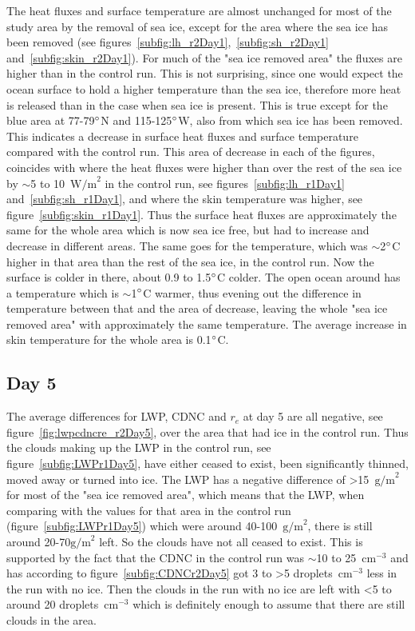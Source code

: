 The heat fluxes and surface temperature are almost unchanged for most of the study area by the removal of sea ice, except for the area where the sea ice has been removed (see figures~\ref{subfig:lh_r2Day1},~\ref{subfig:sh_r2Day1} and~\ref{subfig:skin_r2Day1}). For much of the "sea ice removed area" the fluxes are higher than in the control run. This is not surprising, since one would expect the ocean surface to hold a higher temperature than the sea ice, therefore more heat is released than in the case when sea ice is present. This is true except for the blue area at 77-79$\degree$N and 115-125$\degree$W, also from which sea ice has been removed. This indicates a decrease in surface heat fluxes and surface temperature compared with the control run. This area of decrease in each of the figures, coincides with where the heat fluxes were higher than over the rest of the sea ice by $\sim$5 to 10~$\text{W/m}^2$ in the control run, see figures~\ref{subfig:lh_r1Day1} and~\ref{subfig:sh_r1Day1}, and where the skin temperature was higher, see figure~\ref{subfig:skin_r1Day1}. Thus the surface heat fluxes are approximately the same for the whole area which is now sea ice free, but had to increase and decrease in different areas. The same goes for the temperature, which was $\sim$2$\degree$C higher in that area than the rest of the sea ice, in the control run. Now the surface is colder in there, about 0.9 to 1.5$\degree$C colder. The open ocean around has a temperature which is $\sim$1$\degree$C warmer, thus evening out the difference in temperature between that and the area of decrease, leaving the whole "sea ice removed area" with approximately the same temperature. The average increase in skin temperature for the whole area is 0.1$\degree$C.

\clearpage
\subsection{Day 5}
The average differences for LWP, CDNC and $r_e$ at day 5 are all negative, see figure~\ref{fig:lwpcdncre_r2Day5}, over the area that had ice in the control run. Thus the clouds making up the LWP in the control run, see figure~\ref{subfig:LWPr1Day5}, have either ceased to exist, been significantly thinned, moved away or turned into ice. The LWP has a negative difference of >15~$\text{g/m}^2$ for most of the "sea ice removed area", which means that the LWP, when comparing with the values for that area in the control run (figure~\ref{subfig:LWPr1Day5}) which were around 40-100~$\text{g/m}^2$, there is still around 20-70$\text{g/m}^2$ left. So the clouds have not all ceased to exist. This is supported by the fact that the CDNC in the control run was $\sim$10 to 25~$\text{cm}^{-3}$ and has according to figure~\ref{subfig:CDNCr2Day5} got 3 to >5 droplets~$\text{cm}^{-3}$ less in the run with no ice. Then the clouds in the run with no ice are left with <5 to around 20 droplets~$\text{cm}^{-3}$ which is definitely enough to assume that there are still clouds in the area.

